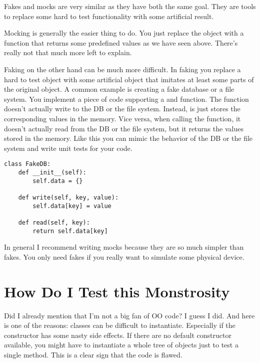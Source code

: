 Fakes and mocks are very similar as they have both the same goal. They are tools to replace some hard to test functionality with some artificial result.

Mocking is generally the easier thing to do. You just replace the object with a function that returns some predefined values as we have seen above. There's really not that much more left to explain.

Faking on the other hand can be much more difficult. In faking you replace a hard to test object with some artificial object that imitates at least some parts of the original object. A common example is creating a fake database or a file system. You implement a piece of code supporting a  and  function. The  function doesn't actually write to the DB or the file system. Instead, is just stores the corresponding values in the memory. Vice versa, when calling the  function, it doesn't actually read from the DB or the file system, but it returns the values stored in the memory. Like this you can mimic the behavior of the DB or the file system and write unit tests for your code.

\begin{programcode}{}
\begin{verbatim}
class FakeDB:
    def __init__(self):
        self.data = {}

    def write(self, key, value):
        self.data[key] = value

    def read(self, key):
        return self.data[key]
\end{verbatim}
\end{programcode}


In general I recommend writing mocks because they are so much simpler than fakes. You only need fakes if you really want to simulate some physical device.


\chapter{How Do I Test this Monstrosity}\label{chap:how_do_i_test_this_monstrosity}

Did I already mention that I'm not a big fan of OO code? I guess I did. And here is one of the reasons: classes can be difficult to instantiate. Especially if the constructor has some nasty side effects. If there are no default constructor available, you might have to instantiate a whole tree of objects just to test a single method. This is a clear sign that the code is flawed.

